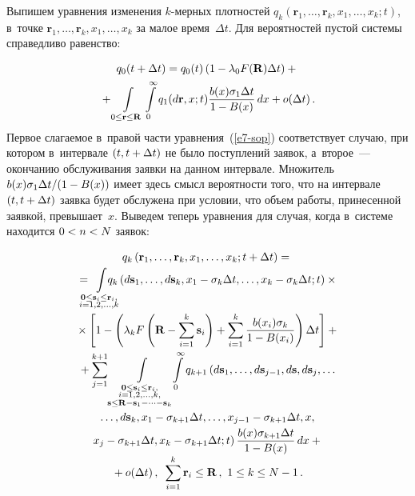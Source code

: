 \begin{multicols}{2}
  Выпишем уравнения изменения $k$-мер\-ных плотностей 
$q_k(\mathbf{r}_1,\ldots, \mathbf{r}_k, x_1,\ldots , x_k;t)$,  в~точке 
$\mathbf{r}_1, \ldots, \mathbf{r}_k, x_1, \ldots , x_k$ за малое время~$\Delta t$. 
Для вероятностей пустой системы справедливо равенство:

\noindent
  \begin{multline}
  q_0(t+\Delta t) =q_0(t) \left( 1-\lambda_0 F(\mathbf{R}) \Delta t\right) +{}\\
  {}+\int\limits_{0\leq \mathbf{r}\leq \mathbf{R}} \int\limits^\infty_0 
q_1(d\mathbf{r},x;t) \displaystyle\frac{\displaystyle b(x) \sigma_1\Delta t\mathstrut}{\displaystyle 1-B(x)\mathstrut}\,dx +o(\Delta t)\,.
  \label{e7-sop}
  \end{multline}
Первое слагаемое в~правой части уравнения~(\ref{e7-sop})\linebreak
 соответствует 
случаю, при котором в~интервале $(t, t\hm+\Delta t)$ не было поступлений 
заявок, а~второе~--- окончанию обслуживания заявки на данном интервале. 
Множитель $b(x)\sigma_1\Delta t/(1\hm-B(x))$ имеет здесь смысл вероятности 
того, что на интервале $(t, t\hm+\Delta t)$ заявка будет обслужена при 
условии, что объем работы, принесенной заявкой, превышает~$x$. Выведем 
теперь уравнения для случая, когда в~сис\-те\-ме находится $0\hm< n\hm< N$ 
заявок:

\vspace*{-3pt}

\noindent
\begin{multline}
q_k\left( \mathbf{r}_1,\ldots,\mathbf{r}_k, x_1,\ldots ,x_k; t+\Delta t\right)={}\\[-1pt]
{}=\hspace*{-3mm}\int\limits_{\substack{{\mathbf{0}\leq \mathbf{s}_i\leq \mathbf{r}_i,}\\[-1pt]  {i=1,2,\ldots,k}}} 
\hspace*{-4mm}\hspace*{-2.7pt}q_k\left( d\mathbf{s}_1, \ldots, d\mathbf{s}_k, x_1-\sigma_k \Delta t,\ldots, x_k-\sigma_k\Delta t; 
t\right) \times{}\\[-1pt]
{}\times\left[ 1-\left( \lambda_k F \left( \mathbf{R} -\sum\limits^k_{i=1} \mathbf{s}_i\right) 
+\sum\limits^k_{i=1} \fr{b(x_i) \sigma_k}{1-B(x_i)}\right)\Delta t\right]+{}\\[-1pt]
{}+\sum\limits_{j=1}^{k+1} \int\limits_{\substack{{\mathbf{0}\leq \mathbf{s}_i\leq \mathbf{r}_i,}\\[-1pt]  
{i=1,2,\ldots,k,}\\ {\mathbf{s}\leq \mathbf{R}-\mathbf{s}_1-\cdots -\mathbf{s}_k}}}\!\!
\int\limits_0^\infty q_{k+1}\left( d\mathbf{s}_1, \ldots, d\mathbf{s}_{j-1}, d\mathbf{s}, d\mathbf{s}_j,\ldots\right.\\[-1pt]
\ldots, d\mathbf{s}_k, x_1-
\sigma_{k+1}\Delta t, \ldots, x_{j-1}-\sigma_{k+1}\Delta t, x,\\[-1pt]
\left. x_j-\sigma_{k+1} 
\Delta t, x_k-\sigma_{k+1}\Delta t; t\right)
 \fr{b(x) \sigma_{k+1}\Delta t}{1-B(x)}\,dx +{}\\[-3pt]
 {}+o(\Delta t)\,,\enskip 
\sum\limits^k_{i=1} \mathbf{r}_i \leq \mathbf{R}\,,\ 1\leq k\leq N-1\,.
\label{e8-sop}
\end{multline}
  

\end{multicols}
